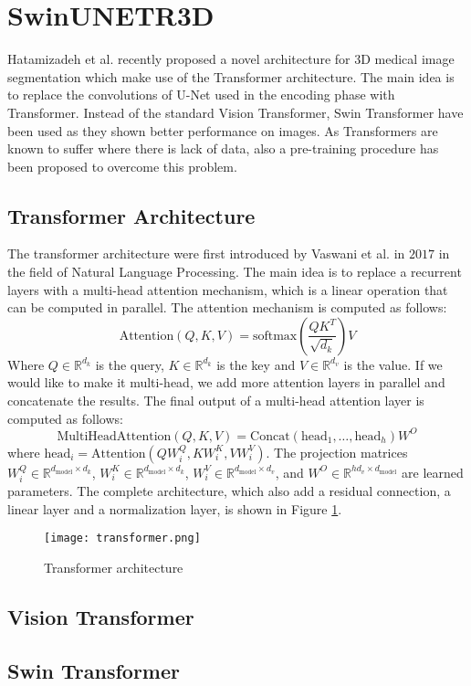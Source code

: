 \section{SwinUNETR3D}
Hatamizadeh et al. recently proposed a novel architecture for 3D medical image
segmentation which make use of the Transformer architecture. The main idea is to
replace the convolutions of U-Net used in the encoding phase with Transformer.
Instead of the standard Vision Transformer, Swin Transformer have been used as
they shown better performance on images. As Transformers are known to suffer
where there is lack of data, also a pre-training procedure has been proposed to
overcome this problem.

\subsection{Transformer Architecture}
The transformer architecture were first introduced by Vaswani et al. in $2017$ in the field of Natural Language Processing.
The main idea is to replace a recurrent layers with a multi-head attention
mechanism, which is a linear operation that can be computed in parallel.
The attention mechanism is computed as follows:
\begin{equation}
  \label{eq:attention}
  \text{Attention}(Q,K,V) = \text{softmax}(\frac{QK^T}{\sqrt{d_k}})V
\end{equation}
Where $Q \in \mathbb{R}^{d_k}$ is the query, $K \in \mathbb{R}^{d_k}$ is the key
and $V \in \mathbb{R}^{d_v}$ is the value.
If we would like to make it multi-head, we add more attention layers in parallel
and concatenate the results. The final output of a multi-head attention layer is computed as follows:
\begin{equation}
  \label{eq:multiheadattention}
  \text{MultiHeadAttention}(Q,K,V) = \text{Concat}(\text{head}_1, \dots, \text{head}_h)W^O
\end{equation}
where $\text{head}_i = \text{Attention}(QW_i^Q, KW_i^K, VW_i^V)$.
The projection matrices $W_i^Q \in \mathbb{R}^{d_{\text{model}} \times d_k}$,
$W_i^K \in \mathbb{R}^{d_{\text{model}} \times d_k}$, $W_i^V \in
\mathbb{R}^{d_{\text{model}} \times d_v}$, and $W^O \in \mathbb{R}^{hd_v \times d_\text{model}}$ are learned parameters.
The complete architecture, which also add a residual connection, a linear layer
and a normalization layer, is shown in Figure \ref{fig:transformer}.
\begin{figure}[h]
  \centering
  \texttt{[image: transformer.png]}
  \caption{Transformer architecture}
  \label{fig:transformer}
\end{figure}


\subsection{Vision Transformer}
\subsection{Swin Transformer}

